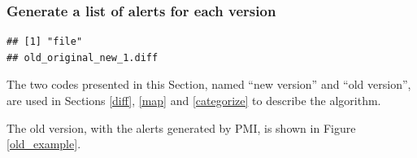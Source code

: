 \documentclass[
]{article}
\begin{document}
\subsubsection{Generate a list of alerts for each version}\label{codes}

\small

\begin{verbatim}
## [1] "file"
## old_original_new_1.diff
\end{verbatim}

\normalsize

The two codes presented in this Section, named ``new version'' and ``old
version'', are used in Sections \ref{diff}, \ref{map} and
\ref{categorize} to describe the algorithm.

The old version, with the alerts generated by PMI, is shown in Figure
\ref{old_example}.

\newpage
\end{document}
